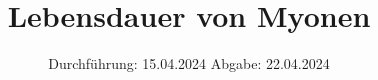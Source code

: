 

\subject{Versuch 01}
\title{Lebensdauer von Myonen}
\date{%
  Durchführung: 15.04.2024
  \hspace{3em}
  Abgabe: 22.04.2024
}



\maketitle
\thispagestyle{empty}
\tableofcontents
\newpage






\nocite{*}
\printbibliography



